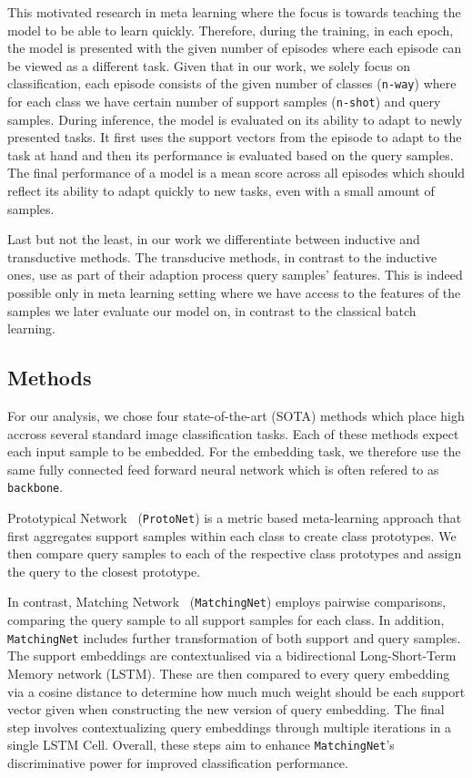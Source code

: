 This motivated research in meta learning where the focus is towards teaching the model to be able to learn quickly. Therefore, during the training, in each epoch, the model is presented with the given number of episodes where each episode can be viewed as a different task. Given that in our work, we solely focus on classification, each episode consists of the given number of classes (\texttt{n-way}) where for each class we have certain number of support samples (\texttt{n-shot}) and query samples. During inference, the model is evaluated on its ability to adapt to newly presented tasks.  It first uses the support vectors from the episode to adapt to the task at hand and then its performance is evaluated based on the query samples. The final performance of a model is a mean score across all episodes which should reflect its ability to adapt quickly to new tasks, even with a small amount of samples.

Last but not the least, in our work we differentiate between inductive and transductive methods. The transducive methods, in contrast to the inductive ones, use as part of their adaption process query samples' features. This is indeed possible only in meta learning setting where we have access to the features of the samples we later evaluate our model on, in contrast to the classical batch learning.

\subsection{Methods}
For our analysis, we chose four state-of-the-art (SOTA) methods which place high accross several standard image classification tasks. Each of these methods expect each input sample to be embedded. For the embedding task, we therefore use the same fully connected feed forward neural network which is often refered to as \texttt{backbone}.

Prototypical Network~\cite{protonet} (\texttt{ProtoNet}) is a metric based meta-learning approach that first aggregates support samples within each class to create class prototypes. We then compare query samples to each of the respective class prototypes and assign the query to the closest prototype.

In contrast, Matching Network~\cite{matchingnet} (\texttt{MatchingNet}) employs pairwise comparisons, comparing the query sample to all support samples for each class. In addition, \texttt{MatchingNet} includes further transformation of both support and query samples. The support embeddings are contextualised via a bidirectional Long-Short-Term Memory network (LSTM). These are then compared to every query embedding via a cosine distance to determine how much much weight should be each support vector given when constructing the new version of query embedding. The final step involves contextualizing query embeddings through multiple iterations in a single LSTM Cell. Overall, these steps aim to enhance \texttt{MatchingNet}'s discriminative power for improved classification performance.

